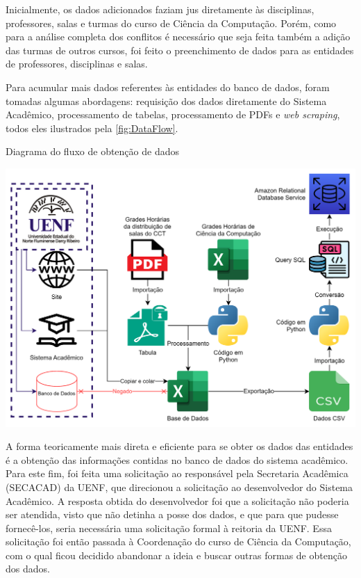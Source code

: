 Inicialmente, os dados adicionados faziam jus diretamente às disciplinas, professores, salas e turmas do curso de Ciência da Computação. Porém, como para a análise completa dos conflitos é necessário que seja feita também a adição das turmas de outros cursos, foi feito o preenchimento de dados para as entidades de professores, disciplinas e salas.

Para acumular mais dados referentes às entidades do banco de dados, foram tomadas algumas abordagens: requisição dos dados diretamente do Sistema Acadêmico, processamento de tabelas, processamento de PDFs e \textit{web scraping}, todos eles ilustrados pela \autoref{fig:DataFlow}.

\begin{MyCenteredFigure}
  \caption{Diagrama do fluxo de obtenção de dados}
  \label{fig:DataFlow}
  \includegraphics[width=\textwidth]{files/img/2.02!5-desenvolvimento/2.02!5.1.4-sistema/Processamento de dados.drawio}
\end{MyCenteredFigure}

A forma teoricamente mais direta e eficiente para se obter os dados das entidades é a obtenção das informações contidas no banco de dados do sistema acadêmico. Para este fim, foi feita uma solicitação ao responsável pela Secretaria Acadêmica (SECACAD) da UENF, que direcionou a solicitação ao desenvolvedor do Sistema Acadêmico. A resposta obtida do desenvolvedor foi que a solicitação não poderia ser atendida, visto que não detinha a posse dos dados, e que para que pudesse fornecê-los, seria necessária uma solicitação formal à reitoria da UENF. Essa solicitação foi então passada à Coordenação do curso de Ciência da Computação, com o qual ficou decidido abandonar a ideia e buscar outras formas de obtenção dos dados.


